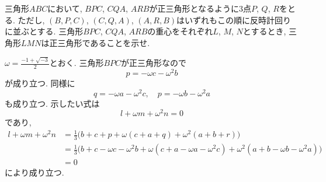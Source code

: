 \begin{bprb}[Napoleonの定理]
三角形$ABC$において, $BPC$, $CQA$, $ARB$が正三角形となるように$3$点$P$, $Q$, $R$をとる.
ただし, $(B,P,C)$, $(C,Q,A)$, $(A,R,B)$はいずれもこの順に反時計回りに並ぶとする.
三角形$BPC$, $CQA$, $ARB$の重心をそれぞれ$L$, $M$, $N$とするとき, 三角形$LMN$は正三角形であることを示せ.
\end{bprb}
\begin{ifsol*}
$\omega=\frac{-1+\sqrt{-3}}{2}$とおく.
三角形$BPC$が正三角形なので
\[p=-\omega c-\omega^2b\]
が成り立つ.
同様に
\[q=-\omega a-\omega^2c,\quad p=-\omega b-\omega^2a\]
も成り立つ.
示したい式は
\[l+\omega m+\omega^2n=0\]
であり,
\begin{align*}
l+\omega m+\omega^2n
&=\frac 13\bigl(b+c+p+\omega(c+a+q)+\omega^2(a+b+r)\bigr)\\
&=\frac 13\bigl(b+c-\omega c-\omega^2b+\omega(c+a-\omega a-\omega^2c)+\omega^2(a+b-\omega b-\omega^2a)\bigr)\\
&=0
\end{align*}
により成り立つ.
\end{ifsol*}